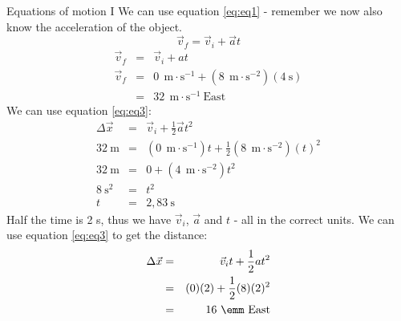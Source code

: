 \begin{wex}{Equations of motion I}
{ We can use equation \ref{eq:eq1} - remember we now also know the acceleration of the object.
\begin{displaymath}
\vec{v}_f = \vec{v}_i + \vec{a}t
\end{displaymath}
\begin{eqnarray*}
\vec{v}_f &=& \vec{v}_i + at\\
\vec{v}_f &=& 0\ ~\text{m}\cdot \text{s}^{-1} +(8\ ~\text{m}\cdot \text{s}^{-2})(4\ \text{s})\\
&=&32\ ~\text{m}\cdot \text{s}^{-1}~\text{East}
\end{eqnarray*}
We can use equation \ref{eq:eq3}:
\begin{eqnarray*}
\Delta \vec{x} &=& \vec{v}_i + \frac{1}{2}\vec{a}t^2\\
32\ \text{m} &=& (0\ ~\text{m}\cdot \text{s}^{-1})t + \frac{1}{2}(8\ ~\text{m}\cdot \text{s}^{-2})(t)^2\\
32\ \text{m} &=& 0 + (4\ ~\text{m}\cdot \text{s}^{-2})t^2\\
8\ \text{s}^2 &=& t^2\\
t &=& 2,83~\text{s}
\end{eqnarray*}
Half the time is 2 s, thus we have $\vec{v}_i$, $\vec{a}$ and $t$ - all in the correct units. We can use equation \ref{eq:eq3} to get the distance:
\begin{eqnarray*}
\Delta \vec{x}&=&\vec{v}_it+\frac{1}{2}at^2\\
&=&(0)(2)+\frac{1}{2}(8)(2)^2\\
&=&16\ \emm~\text{East}
\end{eqnarray*}
}
\end{wex}
    \noindent
\label{m38796*secfhsst!!!underscore!!!id5845}
